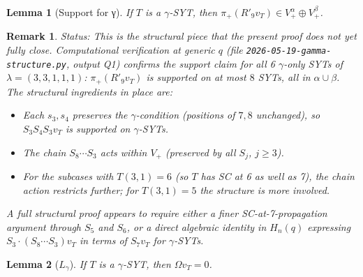 \documentclass[11pt]{article}
\newtheorem{lemma}{Lemma}
\newtheorem*{remark}{Remark}
\newcommand{\Vp}{V_{+}}
\newcommand{\Vpalpha}{V_{+}^{\alpha}}
\newcommand{\Vpbeta}{V_{+}^{\beta}}
\begin{document}
\begin{lemma}[Support for γ] \label{lem:SLgamma}
If $T$ is a $\gamma$-SYT, then $\pi_+(R'_9 v_T) \in \Vpalpha \oplus \Vpbeta$.
\end{lemma}

\begin{remark} \emph{Status:}
This is the structural piece that the present proof does not yet fully close.
Computational verification at generic $q$ (file
\texttt{2026-05-19-gamma-structure.py}, output Q1) confirms the support claim
for all 6 $\gamma$-only SYTs of $\lambda = (3,3,1,1,1)$:
$\pi_+(R'_9 v_T)$ is supported on at most $8$ SYTs, all in $\alpha \cup \beta$.
The structural ingredients in place are:
\begin{itemize}
\item Each $s_3, s_4$ preserves the $\gamma$-condition (positions of $7,8$
unchanged), so $S_3 S_4 S_3 v_T$ is supported on $\gamma$-SYTs.
\item The chain $S_8 \cdots S_3$ acts within $\Vp$ (preserved by all $S_j$, $j \ge 3$).
\item For the subcases with $T(3,1) = 6$ (so $T$ has SC at 6 as well as 7), the
chain action restricts further; for $T(3,1) = 5$ the structure is more involved.
\end{itemize}
A full structural proof appears to require either a finer SC-at-7-propagation
argument through $S_5$ and $S_6$, or a direct algebraic identity in $H_n(q)$
expressing $S_3 \cdot (S_8 \cdots S_3) v_T$ in terms of $S_7 v_T$ for $\gamma$-SYTs.
\end{remark}

\begin{lemma}[$L_\gamma$] \label{lem:Lgamma}
If $T$ is a $\gamma$-SYT, then $\Omega v_T = 0$.
\end{lemma}
\end{document}
